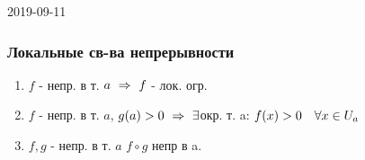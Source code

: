 \documentclass[main]{subfiles}
\begin{document}
\begin{lect}{2019-09-11}
    \subsubsection{Локальные св-ва непрерывности}
		\begin{theorem}
				\begin{enumerate}
						\item $f$ - непр. в т. $a \ \Rightarrow\  f$ - лок. огр.
						\item $f$ - непр. в т. $a$, $g(a) > 0 \ \Rightarrow\  \exists$окр. т. a: $f(x) > 0\quad \forall x \in U_a$
						\item $f, g$ - непр. в т. $a$ $f \circ g$ непр в a.
				\end{enumerate}
		\end{theorem}
\end{lect}
\end{document}
